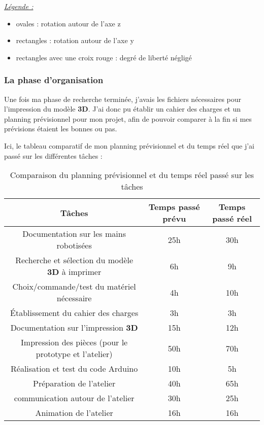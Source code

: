 \begin{flushleft}
    \underline{\textit{\large Légende :}}
\end{flushleft}

\begin{itemize}
    \item ovales : rotation autour de l'axe z
    \item rectangles : rotation autour de l'axe y
    \item rectangles avec une croix rouge : degré de liberté négligé
\end{itemize}

\newpage

\subsubsection{La phase d'organisation}
Une fois ma phase de recherche terminée, j'avais les fichiers nécessaires pour l'impression du modèle \textbf{3D}. J'ai donc pu établir un cahier des charges et un planning prévisionnel pour mon projet, afin de pouvoir comparer à la fin si mes prévisions étaient les bonnes ou pas.

\vspace{0.5cm}
Ici, le tableau comparatif de mon planning prévisionnel et du temps réel que j'ai passé  sur les différentes tâches :

\begin{table}[!h]
    \centering
    \begin{tabular}{|c|c|c|}
        \hline Tâches & Temps passé prévu & Temps passé réel \\
        \hline Documentation sur les mains robotisées & 25h & 30h \\
        \hline Recherche et sélection du modèle \textbf{3D} à imprimer & 6h & 9h \\
        \hline Choix/commande/test du matériel nécessaire & 4h & 10h \\
        \hline \'Etablissement du cahier des charges & 3h & 3h \\
        \hline Documentation sur l'impression \textbf{3D} & 15h & 12h \\
        \hline Impression des pièces (pour le prototype et l'atelier) & 50h & 70h \\
        \hline Réalisation et test du code Arduino & 10h & 5h \\
        \hline Préparation de l'atelier & 40h & 65h \\
        \hline communication autour de l'atelier & 30h & 25h \\
        \hline Animation de l'atelier & 16h & 16h \\
        \hline
    \end{tabular}
    \caption[\, \, Planning]{Comparaison du planning prévisionnel et du temps réel passé sur les tâches}
    \label{tab_4.1.2.1}
\end{table}

